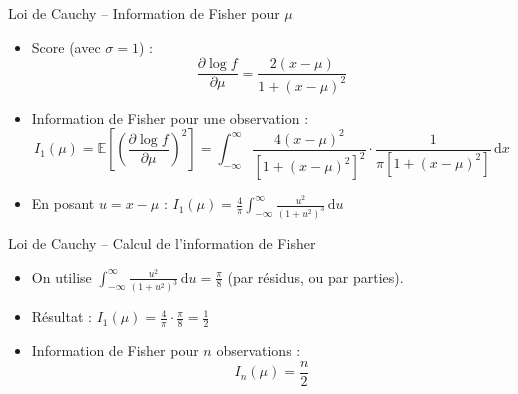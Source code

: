 \documentclass[11pt,aspectratio=169]{beamer}
\newcommand{\dd}{\mathrm{d}}
\begin{document}
\begin{frame}{Loi de Cauchy -- Information de Fisher pour $\mu$}

\begin{itemize}

\item Score (avec $\sigma = 1$) :
  \[
  \frac{\partial \log f}{\partial \mu} = \frac{2(x - \mu)}{1 + (x-\mu)^2}
  \]

\item Information de Fisher pour une observation :
  \[
  I_1(\mu) = \mathbb{E}\left[\left(\frac{\partial \log f}{\partial \mu}\right)^2\right] = \int_{-\infty}^{\infty} \frac{4(x-\mu)^2}{[1+(x-\mu)^2]^2} \cdot \frac{1}{\pi[1+(x-\mu)^2]} \, \dd x
  \]

\item En posant $u = x - \mu$ : $I_1(\mu) = \frac{4}{\pi} \int_{-\infty}^{\infty} \frac{u^2}{(1+u^2)^3} \, \dd u$

\end{itemize}

\end{frame}

\begin{frame}{Loi de Cauchy -- Calcul de l'information de Fisher}

\begin{itemize}

\item On utilise $\displaystyle \int_{-\infty}^{\infty} \frac{u^2}{(1+u^2)^3} \, \dd u = \frac{\pi}{8}$ (par résidus, ou par parties).\newline

\item Résultat : $I_1(\mu) = \frac{4}{\pi} \cdot \frac{\pi}{8} = \frac{1}{2}$\newline

\item Information de Fisher pour $n$ observations :
  \[
  \boxed{I_n(\mu) = \frac{n}{2}}
  \]

\end{itemize}

\end{frame}
\end{document}
